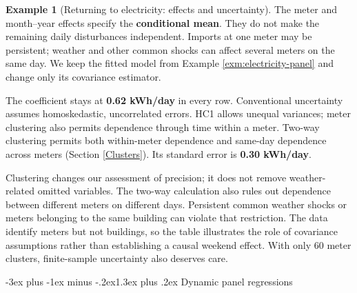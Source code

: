 \documentclass[
  11pt,
]{book}
\makeatletter
\renewcommand\section{\@startsection{section}{1}{\z@}
  {-3ex plus -1ex minus -.2ex}{1.3ex plus .2ex}
  {\normalfont\Large\bfseries\color{TextbookInk}}}
\theoremstyle{definition}
\theoremstyle{definition}
\newtheorem{example}{Example}[chapter]
\theoremstyle{definition}
\theoremstyle{definition}
\theoremstyle{remark}
\makeatother
\begin{document}
\begin{example}[Returning to electricity: effects and uncertainty]
\protect\hypertarget{exm:electricity-panel-inference}{}\label{exm:electricity-panel-inference}The meter and month--year effects specify the \textbf{conditional mean}. They do not make the remaining daily disturbances independent. Imports at one meter may be persistent; weather and other common shocks can affect several meters on the same day. We keep the fitted model from Example \ref{exm:electricity-panel} and change only its covariance estimator.

\begin{table}[H]
\centering\begingroup\fontsize{10}{12}\selectfont

\endgroup{}
\end{table}

The coefficient stays at \textbf{0.62 kWh/day} in every row. Conventional uncertainty assumes homoskedastic, uncorrelated errors. HC1 allows unequal variances; meter clustering also permits dependence through time within a meter. Two-way clustering permits both within-meter dependence and same-day dependence across meters (Section \ref{Clusters}). Its standard error is \textbf{0.30 kWh/day}.

Clustering changes our assessment of precision; it does not remove weather-related omitted variables. The two-way calculation also rules out dependence between different meters on different days. Persistent common weather shocks or meters belonging to the same building can violate that restriction. The data identify meters but not buildings, so the table illustrates the role of covariance assumptions rather than establishing a causal weekend effect. With only 60 meter clusters, finite-sample uncertainty also deserves care.
\end{example}

\section{Dynamic panel regressions}\label{DynPanel}
\end{document}
